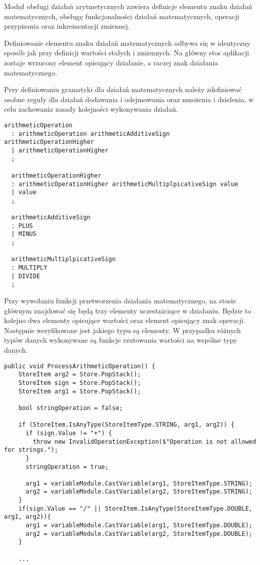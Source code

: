 \par Moduł obsługi działań arytmetycznych zawiera definicje elementu znaku działań matematycznych, obsługę funkcjonalności działań matematycznych, operacji przypisania oraz inkrementacji zmiennej.
\par Definiowanie elementu znaku działań matematycznych odbywa się w identyczny sposób jak przy definicji wartości stałych i zmiennych. Na główny stos aplikacji zostaje wrzucony element opisujący działanie, a raczej znak działania matematycznego.
\par Przy definiowaniu gramatyki dla działań matematycznych należy zdefiniować osobne reguły dla działań dodawania i odejmowania oraz mnożenia i dzielenia, w celu zachowania zasady kolejności wykonywania działań.

\begin{lstlisting}[caption=Definicja gramatyki dla funkcji działań matematycznych, label=alg:arytm1]
  arithmeticOperation
  : arithmeticOperation arithmeticAdditiveSign arithmeticOperationHigher
  | arithmeticOperationHigher
  ;

  arithmeticOperationHigher
  : arithmeticOperationHigher arithmeticMultiplpicativeSign value
  | value
  ;

  arithmeticAdditiveSign
  : PLUS
  | MINUS
  ;

  arithmeticMultiplpicativeSign
  : MULTIPLY
  | DIVIDE
  ;
\end{lstlisting}


\par Przy wywołaniu funkcji przetworzenia działania matematycznego, na stosie głównym znajdować się będą trzy elementy uczestniczące w działaniu. Będzie to kolejno dwa elementy opisujące wartości oraz element opisujący znak operacji. Następnie weryfikowane jest jakiego typu są elementy. W przypadku różnych typów danych wykonywane są funkcje rzutowania wartości na wspólne typy danych.

\begin{lstlisting}[language=CSharp, caption=Implementacja funkcji obsługującej działania matematyczne cz.1, label=alg:arytm2]
  public void ProcessArithmeticOperation() {
    StoreItem arg2 = Store.PopStack();
    StoreItem sign = Store.PopStack();
    StoreItem arg1 = Store.PopStack();

    bool stringOperation = false;

    if (StoreItem.IsAnyType(StoreItemType.STRING, arg1, arg2)) {
      if (sign.Value != "+") {
        throw new InvalidOperationException($"Operation is not allowed for strings.");
      }
      stringOperation = true;

      arg1 = variableModule.CastVariable(arg1, StoreItemType.STRING);
      arg2 = variableModule.CastVariable(arg2, StoreItemType.STRING);
    }
    if(sign.Value == "/" || StoreItem.IsAnyType(StoreItemType.DOUBLE, arg1, arg2)){
      arg1 = variableModule.CastVariable(arg1, StoreItemType.DOUBLE);
      arg2 = variableModule.CastVariable(arg2, StoreItemType.DOUBLE);
    }

    ...
\end{lstlisting}

